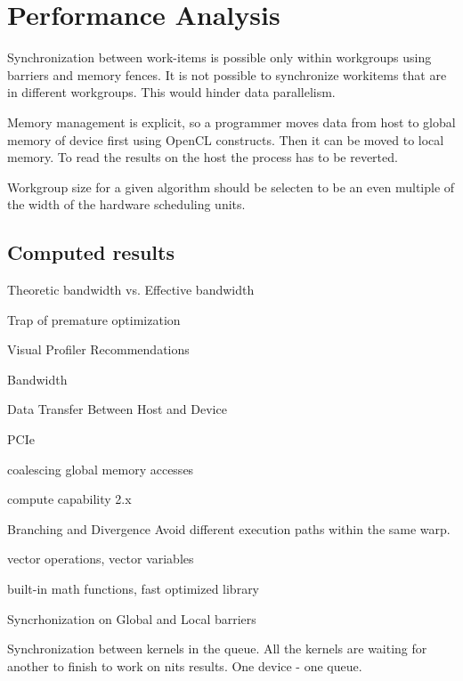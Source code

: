\chapter{Performance Analysis}

Synchronization between work-items is possible only within workgroups using barriers and memory fences. It is not possible to synchronize workitems that are in different workgroups. This would hinder data parallelism.

Memory management is explicit, so a programmer moves data from host to global memory of device first using OpenCL constructs. Then it can be moved to local memory. To read the results on the host the process has to be reverted.

Workgroup size for a given algorithm should be selecten to be an even multiple of the width of the hardware scheduling units.

\section{Computed results}
Theoretic bandwidth vs. Effective bandwidth

Trap of premature optimization

Visual Profiler Recommendations

Bandwidth

Data Transfer Between Host and Device

PCIe

coalescing global memory accesses

compute capability 2.x

Branching and Divergence
Avoid different execution paths within the same warp.

vector operations, vector variables

built-in math functions, fast optimized library

Syncrhonization on Global and Local barriers

Synchronization between kernels in the queue. All the kernels are waiting for another to finish to work on nits results.
One device - one queue.